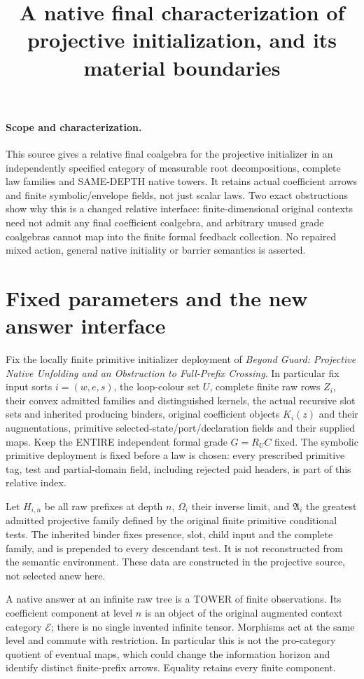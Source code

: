 \documentclass[11pt]{article}
\title{A native final characterization of projective initialization, and its material boundaries}
\begin{document}
\maketitle
\paragraph{Scope and characterization.} This source gives a relative final coalgebra for the projective initializer in an independently specified category of measurable root decompositions, complete law families and SAME-DEPTH native towers. It retains actual coefficient arrows and finite symbolic/envelope fields, not just scalar laws. Two exact obstructions show why this is a changed relative interface: finite-dimensional original contexts need not admit any final coefficient coalgebra, and arbitrary unused grade coalgebras cannot map into the finite formal feedback collection. No repaired mixed action, general native initiality or barrier semantics is asserted.

\section{Fixed parameters and the new answer interface}
Fix the locally finite primitive initializer deployment of \emph{Beyond Guard: Projective Native Unfolding and an Obstruction to Full-Prefix Crossing}. In particular fix input sorts $i=(w,e,s)$, the loop-colour set $U$, complete finite raw rows $Z_i$, their convex admitted families and distinguished kernels, the actual recursive slot sets and inherited producing binders, original coefficient objects $K_i(z)$ and their augmentations, primitive selected-state/port/declaration fields and their supplied maps. Keep the ENTIRE independent formal grade $G=R_UC$ fixed. The symbolic primitive deployment is fixed before a law is chosen: every prescribed primitive tag, test and partial-domain field, including rejected paid headers, is part of this relative index.

Let $H_{i,n}$ be all raw prefixes at depth $n$, $\Omega_i$ their inverse limit, and $\mathfrak A_i$ the greatest admitted projective family defined by the original finite primitive conditional tests. The inherited binder fixes presence, slot, child input and the complete family, and is prepended to every descendant test. It is not reconstructed from the semantic environment. These data are constructed in the projective source, not selected anew here.

A native answer at an infinite raw tree is a TOWER of finite observations. Its coefficient component at level $n$ is an object of the original augmented context category $\mathcal E$; there is no single invented infinite tensor. Morphisms act at the same level and commute with restriction. In particular this is not the pro-category quotient of eventual maps, which could change the information horizon and identify distinct finite-prefix arrows. Equality retains every finite component.
\end{document}
